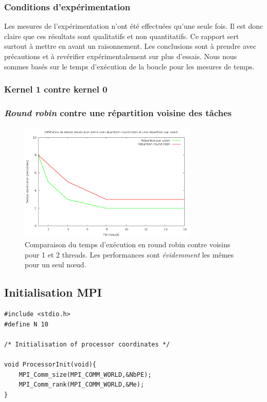 \documentclass[	DIV=calc,%
							paper=a4,%
							fontsize=11pt%
							]{scrartcl}	 					%
\begin{document}
\subsubsection*{Conditions d'expérimentation}
Les mesures de l'expérimentation n'ont été effectuées qu'une seule fois. Il est donc claire que ces résultats sont qualitatifs et non quantitatifs. Ce rapport sert surtout à mettre en avant un raisonnement. Les conclusions sont à prendre avec précautions et à revérifier expérimentalement sur plus d'essais. \newline
Nous nous sommes basés sur le temps d'exécution de la boucle pour les mesures de temps.

\subsubsection*{Kernel 1 contre kernel 0}

\subsubsection*{\textit{Round robin} contre une répartition voisine des tâches}
\begin{figure}
\centering
\includegraphics[keepaspectratio,width=8.5cm]{img/rr_v.png} 
\caption{Comparaison du temps d'exécution en round robin contre voisins pour 1 et 2 threads. Les performances sont \textit{évidemment} les mêmes pour un seul nœud.}
\label{fig:rr_v}
\end{figure}

\subsection*{Initialisation MPI}
\begin{lstlisting}
#include <stdio.h>
#define N 10

/* Initialisation of processor coordinates */

void ProcessorInit(void){
	MPI_Comm_size(MPI_COMM_WORLD,&NbPE);
  	MPI_Comm_rank(MPI_COMM_WORLD,&Me);
}
\end{lstlisting}
\end{document}
